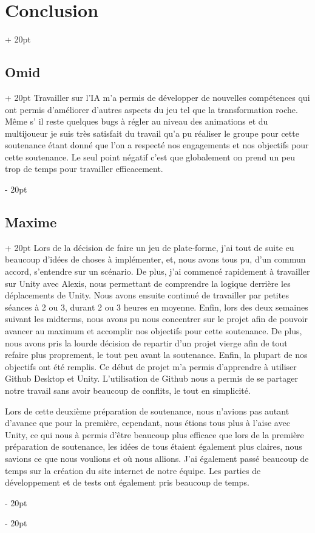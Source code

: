 \documentclass[a4paper, 12pt, twoside]{article}
\newcommand{\ind}[1][20pt]{\advance\leftskip + #1}
\newcommand{\deind}[1][20pt]{\advance\leftskip - #1}
\newenvironment{indt}[2][20pt]{#2 \par \ind[#1]}{\par \deind} %
\begin{document}
\begin{indt}{\section{Conclusion}}
\begin{indt}{\subsection{Omid}}
            Travailler sur l'IA m'a permis de développer de nouvelles compétences qui ont permis d'améliorer d'autres aspects du jeu tel que la transformation roche. Même s' il reste quelques bugs à régler au niveau des animations et du multijoueur je suis très satisfait du travail qu'a pu réaliser le groupe pour cette soutenance étant donné que l'on a respecté nos engagements et nos objectifs pour cette soutenance. Le seul point négatif c'est que globalement on prend un peu trop de temps pour travailler efficacement.
        \end{indt}

        \begin{indt}{\subsection{Maxime}}
            Lors de la décision de faire un jeu de plate-forme, j'ai tout de suite eu beaucoup d'idées de choses à implémenter, et, nous avons tous pu, d'un commun accord, s'entendre sur un scénario. De plus, j'ai commencé rapidement à travailler sur Unity avec Alexis, nous permettant de comprendre la logique derrière les déplacements de Unity. Nous avons ensuite continué de travailler par petites séances à 2 ou 3, durant 2 ou 3 heures en moyenne. Enfin, lors des deux semaines suivant les midterms, nous avons pu nous concentrer sur le projet afin de pouvoir avancer au maximum et accomplir nos objectifs pour cette soutenance. De plus, nous avons pris la lourde décision de repartir d'un projet vierge afin de tout refaire plus proprement, le tout peu avant la soutenance. Enfin, la plupart de nos objectifs ont été remplis. Ce début de projet m'a permis d'apprendre à utiliser Github Desktop et Unity. L'utilisation de Github nous a permis de se partager notre travail sans avoir beaucoup de conflits, le tout en simplicité.
        
            Lors de cette deuxième préparation de soutenance, nous n'avions pas autant d'avance que pour la première, cependant, nous étions tous plus à l'aise avec Unity, ce qui nous à permis d'être beaucoup plus efficace que lors de la première préparation de soutenance, les idées de tous étaient également plus claires, nous savions ce que nous voulions et où nous allions. J'ai également passé beaucoup de temps sur la création du site internet de notre équipe. Les parties de développement et de tests ont également pris beaucoup de temps.
        \end{indt}
    \end{indt}
\end{document}
